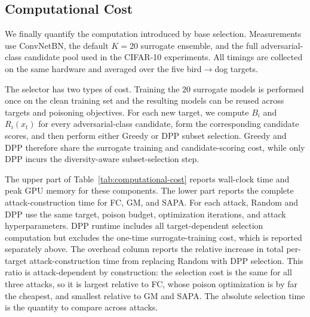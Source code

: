 \subsection{Computational Cost}
\label{sec:computational-cost}

We finally quantify the computation introduced by base selection.
Measurements use ConvNetBN, the default $K=20$ surrogate ensemble, and
the full adversarial-class candidate pool used in the CIFAR-10
experiments. All timings are collected on the same hardware and averaged
over the five bird$\rightarrow$dog targets.

The selector has two types of cost. Training the $20$ surrogate models
is performed once on the clean training set and the resulting models can
be reused across targets and poisoning objectives. For each new target,
we compute $B_i$ and $R_i(x_t)$ for every adversarial-class candidate,
form the corresponding candidate scores, and then perform either Greedy
or DPP subset selection. Greedy and DPP therefore share the surrogate
training and candidate-scoring cost, while only DPP incurs the
diversity-aware subset-selection step.

The upper part of Table~\ref{tab:computational-cost} reports wall-clock
time and peak GPU memory for these components. The lower part reports
the complete attack-construction time for FC, GM, and SAPA. For each
attack, Random and DPP use the same target, poison budget, optimization
iterations, and attack hyperparameters. DPP runtime includes all
target-dependent selection computation but excludes the one-time
surrogate-training cost, which is reported separately above. The
overhead column reports the relative increase in total per-target
attack-construction time from replacing Random with DPP selection. This
ratio is attack-dependent by construction: the selection cost is the same
for all three attacks, so it is largest relative to FC, whose poison
optimization is by far the cheapest, and smallest relative to GM and
SAPA. The absolute selection time is the quantity to compare across
attacks.

